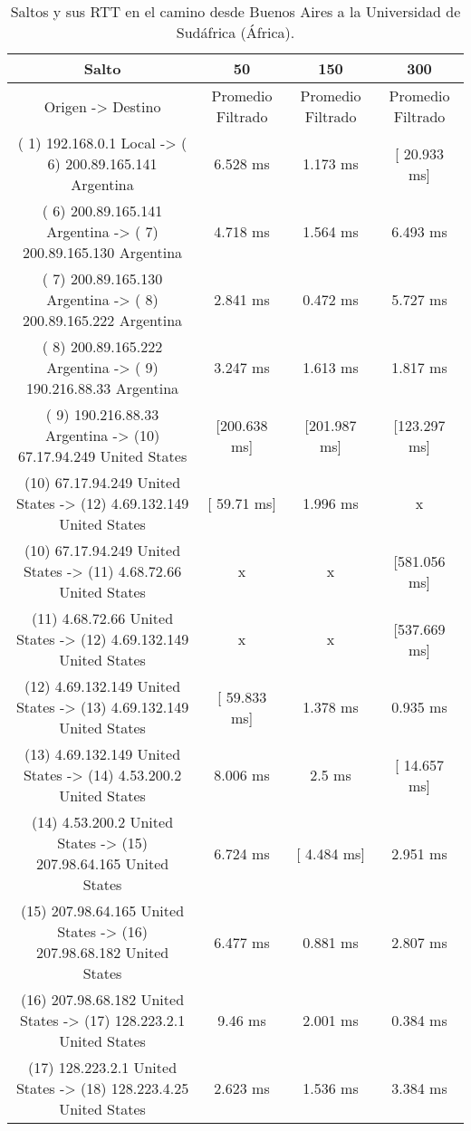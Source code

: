 \begin{table}[]
\centering
\caption{Saltos y sus RTT en el camino desde Buenos Aires a la Universidad de Sudáfrica (África).}
\begin{tabular}{ | c | c | c | c | }
	\hline 
Salto	& 50	& 150	& 300 \\ \hline
               Origen                ->               Destino               	&Promedio Filtrado&	Promedio Filtrado&	Promedio Filtrado \\ \hline
( 1) 192.168.0.1     Local           -> ( 6) 200.89.165.141  Argentina     & 	     6.528 ms  & 	     1.173 ms   &	  [ 20.933 ms]   \\ \hline
( 6) 200.89.165.141  Argentina       -> ( 7) 200.89.165.130  Argentina     & 	     4.718 ms  & 	     1.564 ms   &	     6.493 ms    \\ \hline
( 7) 200.89.165.130  Argentina       -> ( 8) 200.89.165.222  Argentina     & 	     2.841 ms  & 	     0.472 ms   &	     5.727 ms    \\ \hline
( 8) 200.89.165.222  Argentina       -> ( 9) 190.216.88.33   Argentina     & 	     3.247 ms  & 	     1.613 ms   &	     1.817 ms    \\ \hline
( 9) 190.216.88.33   Argentina       -> (10) 67.17.94.249    United States & 	  [200.638 ms] & 	  [201.987 ms]  &	  [123.297 ms]   \\ \hline
(10) 67.17.94.249    United States   -> (12) 4.69.132.149    United States  &	  [  59.71 ms]  &	     1.996 ms    &     	x \\ \hline
(10) 67.17.94.249    United States   -> (11) 4.68.72.66      United States   &       	x      	 &           x	     &     [581.056 ms]   \\ \hline
(11) 4.68.72.66      United States   -> (12) 4.69.132.149    United States  &	       x        &   	       x	     &     [537.669 ms]   \\ \hline
(12) 4.69.132.149    United States   -> (13) 4.69.132.149    United States & 	  [ 59.833 ms] & 	     1.378 ms   &	     0.935 ms    \\ \hline
(13) 4.69.132.149    United States   -> (14) 4.53.200.2      United States & 	     8.006 ms  & 	       2.5 ms   &	  [ 14.657 ms]   \\ \hline
(14) 4.53.200.2      United States   -> (15) 207.98.64.165   United States & 	     6.724 ms  & 	  [  4.484 ms]  &	     2.951 ms    \\ \hline
(15) 207.98.64.165   United States   -> (16) 207.98.68.182   United States & 	     6.477 ms  & 	     0.881 ms   &	     2.807 ms    \\ \hline
(16) 207.98.68.182   United States   -> (17) 128.223.2.1     United States & 	      9.46 ms  & 	     2.001 ms   &	     0.384 ms    \\ \hline
(17) 128.223.2.1     United States   -> (18) 128.223.4.25    United States & 	     2.623 ms  & 	     1.536 ms   &	     3.384 ms    \\ \hline

\end{tabular}
\end{table}
